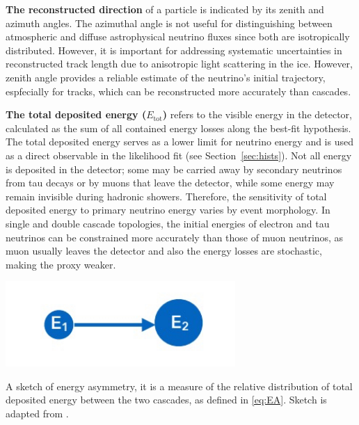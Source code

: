 \textbf{The reconstructed direction} of a particle is indicated by its zenith and azimuth angles. The azimuthal angle is not useful for distinguishing between atmospheric and diffuse astrophysical neutrino fluxes since both are isotropically distributed. However, it is important for addressing systematic uncertainties in reconstructed track length due to anisotropic light scattering in the ice. However, zenith angle provides a reliable estimate of the neutrino's initial trajectory, espfecially for tracks, which can be reconstructed more accurately than cascades.

\textbf{The total deposited energy ($E_{\text{tot}}$)} refers to the visible energy in the detector, calculated as the sum of all contained energy losses along the best-fit hypothesis. The total deposited energy serves as a lower limit for neutrino energy and is used as a direct observable in the likelihood fit (see Section~\ref{sec:hists}). Not all energy is deposited in the detector; some may be carried away by secondary neutrinos from tau decays or by muons that leave the detector, while some energy may remain invisible during hadronic showers. Therefore, the sensitivity of total deposited energy to primary neutrino energy varies by event morphology. In single and double cascade topologies, the initial energies of electron and tau neutrinos can be constrained more accurately than those of muon neutrinos, as muon usually leaves the detector and also the energy losses are stochastic, making the proxy weaker. 
\begin{marginfigure}
	\includegraphics{./figures/EventSample/EA.pdf}
	\caption{A sketch of energy asymmetry, it is a measure of the relative distribution of total deposited energy between the two cascades, as defined in \ref{eq:EA}. Sketch is adapted from \cite{marcel_thesis}.}
\end{marginfigure}

